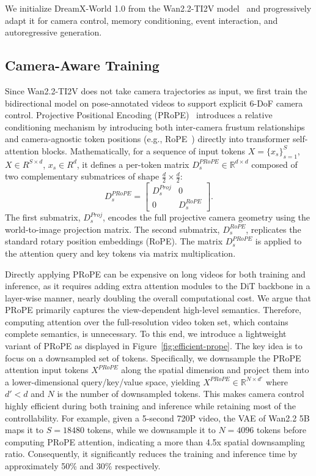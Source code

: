 \documentclass{llmxive}
\providecommand{\method}{DreamX-World 1.0}
\begin{document}
We initialize \method{} from the Wan2.2-TI2V model~\citep{wan2025wan} and progressively adapt it for camera control, memory conditioning, event interaction, and autoregressive generation.

\subsection{Camera-Aware Training}
Since Wan2.2-TI2V does not take camera trajectories as input, we first train
the bidirectional model on pose-annotated videos to support explicit 6-DoF
camera control.
% 
Projective Positional Encoding (PRoPE)~\citep{li2025cameras} introduces a relative conditioning mechanism by introducing both inter-camera frustum relationships and camera-agnostic token positions (e.g., RoPE~\citep{su2024roformer}) directly into transformer self-attention blocks.
Mathematically, for a sequence of input tokens $X=\{x_s\}_{s=1}^{S}$, $X\in R^{S\times d}$, $x_s\in R^{d}$, it defines a per-token matrix $D_s^{PRoPE} \in \mathbb{R}^{d \times d}$  composed of two complementary submatrices of shape $\frac{d}{2} \times \frac{d}{2}$:
$$D_s^{PRoPE} = \begin{bmatrix} D_s^{Proj} & 0 \\ 0 & D_s^{RoPE} \end{bmatrix}.$$
The first submatrix, $D_s^{Proj}$, encodes the full projective camera geometry using the world-to-image projection matrix.
The second submatrix, $D_s^{RoPE}$, replicates the standard rotary position embeddings (RoPE). The matrix $D_s^{PRoPE}$ is applied to the attention query and key tokens via matrix multiplication.

Directly applying PRoPE can be expensive on long videos for both training and inference, as it requires adding extra attention modules to the DiT backbone in a layer-wise manner, nearly doubling the overall computational cost.
We argue that PRoPE primarily captures the view-dependent high-level semantics.
Therefore, computing attention over the full-resolution video token set, which contains complete semantics, is unnecessary.
To this end, we introduce a lightweight variant of PRoPE as displayed in Figure~\ref{fig:efficient-prope}. The key idea is to focus on a downsampled set of tokens. Specifically, we downsample the PRoPE attention input tokens $X^{PRoPE}$ along the spatial dimension and project them into a lower-dimensional query/key/value space, yielding
$X^{PRoPE} \in \mathbb{R}^{N \times d'}$ where $d' < d$ and $N$ is the number of downsampled tokens.  This makes camera control highly efficient during both training and inference  while retaining most of the controllability. For example, given a 5-second 720P video, the VAE of Wan2.2 5B maps it to $S=18480$ tokens, while we downsample it to $N=4096$ tokens before computing PRoPE attention, indicating a more than 4.5x spatial downsampling ratio. Consequently, it significantly reduces the training and inference time by approximately 50\% and 30\% respectively.
\end{document}
